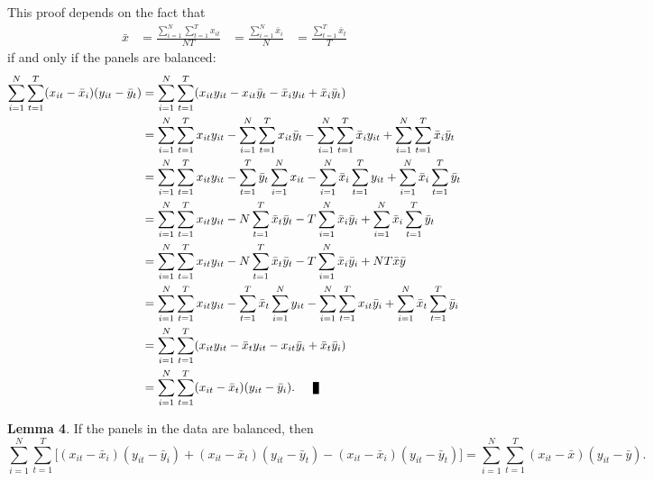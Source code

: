 \documentclass{article}[12pt]
\newenvironment{proof}[1][Proof.]{\begin{trivlist}
\item[\hskip \labelsep {\bfseries #1}]}{\end{trivlist}}
\newcommand{\qed}{\nobreak \ifvmode \relax \else
      \ifdim\lastskip<1.5em \hskip-\lastskip
      \hskip1.5em plus0em minus0.5em \fi \nobreak
      \vrule height0.75em width0.5em depth0.25em\fi}
\begin{document}
\begin{proof}
This proof depends on the fact that 
\begin{equation}
\begin{array}{cccc}
\displaystyle\bar{x} & \displaystyle= \frac{\sum_{i=1}^N \sum_{t=1}^T x_{it}}{NT} &\displaystyle = \frac{\sum_{i=1}^N \bar{x}_{i}}{N} &\displaystyle = \frac{\sum_{t=1}^T \bar{x}_{t}}{T}
\end{array}
\end{equation}
if and only if the panels are balanced:
\begin{align}
\sum_{i=1}^N \sum_{t=1}^T(x_{it}  - \bar{x}_i)(y_{it} - \bar{y}_t)  & = \sum_{i=1}^N \sum_{t=1}^T(x_{it}y_{it} - x_{it}\bar{y}_t  - \bar{x}_iy_{it} + \bar{x}_i\bar{y}_t)\nonumber\\
& = \sum_{i=1}^N \sum_{t=1}^Tx_{it}y_{it} - \sum_{i=1}^N \sum_{t=1}^Tx_{it}\bar{y}_t  - \sum_{i=1}^N \sum_{t=1}^T\bar{x}_iy_{it} + \sum_{i=1}^N \sum_{t=1}^T\bar{x}_i\bar{y}_t\nonumber\\
& = \sum_{i=1}^N \sum_{t=1}^Tx_{it}y_{it} -  \sum_{t=1}^T\bar{y}_t\sum_{i=1}^Nx_{it}  - \sum_{i=1}^N \bar{x}_i\sum_{t=1}^Ty_{it} + \sum_{i=1}^N \bar{x}_i\sum_{t=1}^T\bar{y}_t\nonumber\\
& = \sum_{i=1}^N \sum_{t=1}^Tx_{it}y_{it} -  N\sum_{t=1}^T\bar{x}_{t}\bar{y}_t  - T\sum_{i=1}^N \bar{x}_i\bar{y}_{i} + \sum_{i=1}^N \bar{x}_i\sum_{t=1}^T\bar{y}_t\nonumber\\
& = \sum_{i=1}^N \sum_{t=1}^Tx_{it}y_{it} -  N\sum_{t=1}^T\bar{x}_{t}\bar{y}_t  - T\sum_{i=1}^N \bar{x}_i\bar{y}_{i} + NT \bar{x}\bar{y}\nonumber\\
& = \sum_{i=1}^N \sum_{t=1}^Tx_{it}y_{it} -  \sum_{t=1}^T\bar{x}_{t}\sum_{i=1}^N{y}_{it}  - \sum_{i=1}^N\sum_{t=1}^T x_{it}\bar{y}_{i} + \sum_{i=1}^N \bar{x}_t\sum_{t=1}^T\bar{y}_i\nonumber\\
& = \sum_{i=1}^N \sum_{t=1}^T(x_{it}y_{it} -  \bar{x}_{t}y_{it}  - x_{it}\bar{y}_{i} +  \bar{x}_t\bar{y}_i)\nonumber\\
& = \sum_{i=1}^N \sum_{t=1}^T(x_{it}-\bar{x}_t)(y_{it} -  \bar{y}_{i}).\qed
\end{align}
\end{proof}
\textbf{Lemma 4}. If the panels in the data are balanced, then
\begin{equation}
\sum_{i=1}^N \sum_{t=1}^T\Big[(x_{it}  - \bar{x}_i)(y_{it} - \bar{y}_i) + (x_{it}  - \bar{x}_t)(y_{it} - \bar{y}_t) - (x_{it}  - \bar{x}_i)(y_{it} - \bar{y}_t)\Big]  = \sum_{i=1}^N \sum_{t=1}^T(x_{it}  - \bar{x})(y_{it} - \bar{y}).
\end{equation}
\end{document}
